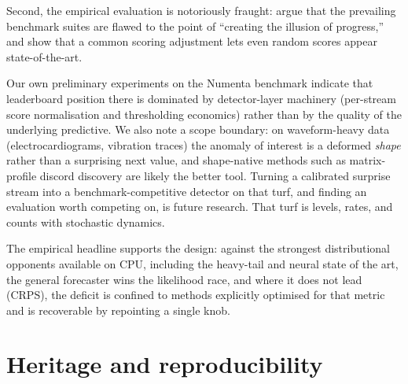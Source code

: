 \documentclass[article]{jss}
\begin{document}
Second, the empirical evaluation is notoriously
fraught: \citet{wu2023current} argue that the prevailing benchmark suites
are flawed to the point of ``creating the illusion of progress,'' and
\citet{kim2022rigorous} show that a common scoring adjustment lets even random
scores appear state-of-the-art.

Our own preliminary experiments on the Numenta
benchmark \citep{lavin2015nab} indicate that leaderboard position there is
dominated by detector-layer machinery (per-stream score normalisation and
thresholding economics) rather than by the quality of the underlying
predictive. We also note a scope boundary: on waveform-heavy data (electrocardiograms,
vibration traces) the anomaly of interest is a deformed \emph{shape} rather
than a surprising next value, and shape-native methods such as matrix-profile
discord discovery are likely the better tool. Turning a calibrated surprise
stream into a benchmark-competitive detector on that turf, and finding an
evaluation worth competing on, is future research. That turf is levels,
rates, and counts with stochastic dynamics.

The
empirical headline supports the design: against the strongest distributional
opponents available on CPU, including the heavy-tail and neural state of the art,
the general forecaster wins the likelihood race, and where it does not lead
(CRPS), the deficit is confined to methods explicitly optimised for that metric
and is recoverable by repointing a single knob.

\section{Heritage and reproducibility} \label{sec:heritage}
\end{document}

